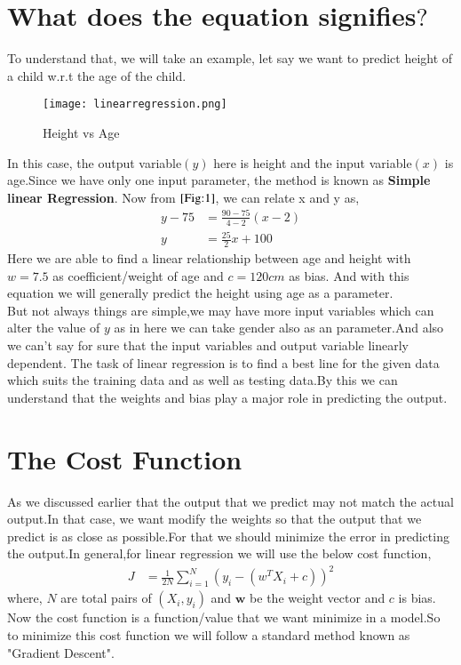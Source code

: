 \documentclass[journal,12pt,onecolumn]{IEEEtran}
\providecommand{\brak}[1]{\ensuremath{\left(#1\right)}}
\theoremstyle{remark}
\numberwithin{equation}{section}
\let\vec\mathbf
\begin{document}
  \section{What does the equation signifies$?$}
   To understand that, we will take an example, let say we want to predict height of a child w.r.t the age of the child.
    \begin{figure}
     \centering
     \texttt{[image: linearregression.png]}
     \caption{Height vs Age}
     \label{Fig:1}
    \end{figure}
    In this case, the output variable$\brak{y}$ here is height and the input variable$\brak{x}$ is age.Since we have only one input parameter, the method is known as \textbf{Simple linear Regression}.
    Now from $\ref{Fig:1}$, we can relate x and y as,
      \begin{align}
	      y - 75 &= \frac{90-75}{4-2}\brak{x-2}\\
	      y &= \frac{25}{2}x + 100
      \end{align}
    Here we are able to find a linear relationship between age and height with $w = 7.5$ as coefficient/weight of age and $c = 120cm$ as bias. And with this equation we
    will generally predict the height using age as a parameter.\\ But not always things are simple,we may have more input variables which can alter the value of $y$ as in here we can take gender also as an parameter.And also we can't say for sure that the input variables and output variable linearly dependent. The task of linear regression is to find a best line for the given data which suits the training data and as well as testing data.By this we can understand that
    the weights and bias play a major role in predicting the output.
   \section{The Cost Function}
    As we discussed earlier that the output that we predict may not match the actual output.In that case, we want modify the weights so that the output that we predict is as close as possible.For that we should minimize the error in predicting the output.In general,for linear regression we will use the below cost function,
                \begin{align}
			J &= \frac{1}{2N}\sum_{i=1}^{N}\brak{y_{i}-\brak{w^TX_{i}+c}}^{2}
		\end{align}
	where, $N$ are total pairs of $\brak{X_{i},y_{i}}$ and $\vec{w}$ be the weight vector and $c$ is bias.
  Now the cost function is a function/value that we want minimize in a model.So to minimize this cost function we will follow a standard method known as "Gradient Descent".
\end{document}
